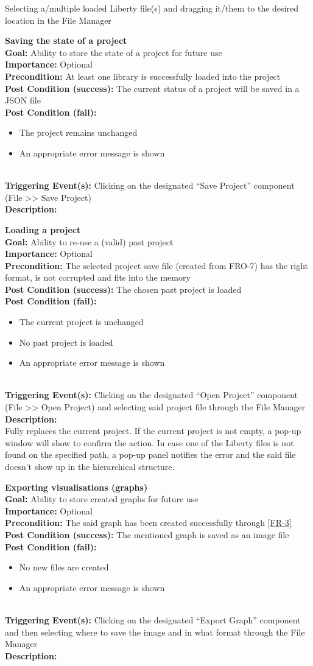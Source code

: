 \documentclass[10pt,a4paper]{report}
\newcommand{\precondition}[1]{
    \textbf{Precondition: } #1 \leavevmode \\
}
\newcommand{\FRODescription}[8]{
    \textbf{#1} \leavevmode \\
    \textbf{Goal: } #2 \leavevmode \\
    \textbf{Importance: } #3 \leavevmode \\
    \precondition{#4}
    \textbf{Post Condition (success): } #5 \leavevmode \\
    \textbf{Post Condition (fail): } #6 \leavevmode \\
    \textbf{Triggering Event(s): } #7 \leavevmode \\
    \textbf{Description: } \leavevmode \\
    #8}
\begin{document}
\begin{FRO}
{\begin{itemize}
    \end{itemize}}
    {Selecting a/multiple loaded Liberty file(s) and dragging it/them to the desired location in the File Manager}
    \item \FRODescription{Saving the state of a project}
    {Ability to store the state of a project for future use}
    {Optional}
    {At least one library is successfully loaded into the project}
    {The current status of a project will be saved in a JSON file}
    {\begin{itemize}
        \item The project remains unchanged
        \item An appropriate error message is shown
    \end{itemize}}
    {Clicking on the designated “Save Project” component (File >> Save Project)}
    \item \FRODescription{Loading a project}
    {Ability to re-use a (valid) past project}
    {Optional}
    {The selected project save file (created from FRO-7) has the right format, is not corrupted and fits into the memory}
    {The chosen past project is loaded}
    {\begin{itemize}
        \item The current project is unchanged
        \item No past project is loaded
        \item An appropriate error message is shown
    \end{itemize}}
    {Clicking on the designated “Open Project” component (File >> Open Project) and selecting said project file through the File Manager}
    {Fully replaces the current project. If the current project is not empty, a pop-up window will show to confirm the action. In case one of the Liberty files is not found on the specified path, a pop-up panel notifies the error and the said file doesn’t show up in the hierarchical structure.}
    \item \FRODescription{Exporting visualisations (graphs)}
    {Ability to store created graphs for future use}
    {Optional}
    {The said graph has been created successfully through \ref{FR-3}}
    {The mentioned graph is saved as an image file}
    {\begin{itemize}
        \item No new files are created
        \item An appropriate error message is shown
    \end{itemize}}
    {Clicking on the designated “Export Graph” component and then selecting where to save the image and in what format through the File Manager}

\end{FRO}
\end{document}
